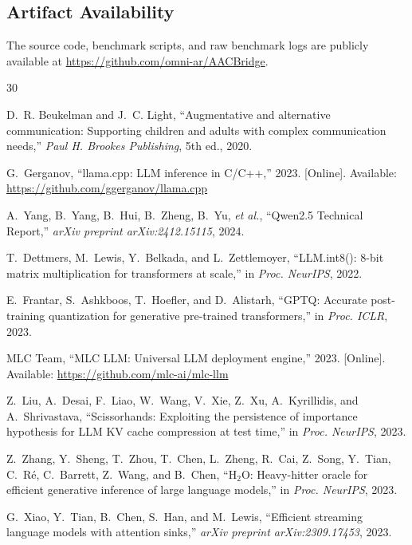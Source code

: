 \documentclass[journal]{IEEEtran}
\begin{document}
\subsection{Artifact Availability}

The source code, benchmark scripts, and raw benchmark logs are publicly available at \url{https://github.com/omni-ar/AACBridge}.

\begin{thebibliography}{30}

D.~R. Beukelman and J.~C. Light,
``Augmentative and alternative communication: Supporting children and adults with complex communication needs,''
\emph{Paul H. Brookes Publishing}, 5th ed., 2020.

G.~Gerganov,
``llama.cpp: LLM inference in {C/C++},''
2023. [Online]. Available: \url{https://github.com/ggerganov/llama.cpp}

A.~Yang, B.~Yang, B.~Hui, B.~Zheng, B.~Yu, \emph{et al.},
``{Qwen2.5 Technical Report},''
\emph{arXiv preprint arXiv:2412.15115}, 2024.

T.~Dettmers, M.~Lewis, Y.~Belkada, and L.~Zettlemoyer,
``{LLM.int8(): 8-bit matrix multiplication for transformers at scale},''
in \emph{Proc. NeurIPS}, 2022.

E.~Frantar, S.~Ashkboos, T.~Hoefler, and D.~Alistarh,
``{GPTQ: Accurate post-training quantization for generative pre-trained transformers},''
in \emph{Proc. ICLR}, 2023.

MLC Team,
``{MLC LLM}: Universal {LLM} deployment engine,''
2023. [Online]. Available: \url{https://github.com/mlc-ai/mlc-llm}

Z.~Liu, A.~Desai, F.~Liao, W.~Wang, V.~Xie, Z.~Xu, A.~Kyrillidis, and A.~Shrivastava,
``Scissorhands: Exploiting the persistence of importance hypothesis for {LLM} {KV} cache compression at test time,''
in \emph{Proc. NeurIPS}, 2023.

Z.~Zhang, Y.~Sheng, T.~Zhou, T.~Chen, L.~Zheng, R.~Cai, Z.~Song, Y.~Tian, C.~R\'{e}, C.~Barrett, Z.~Wang, and B.~Chen,
``{H$_2$O: Heavy-hitter oracle for efficient generative inference of large language models},''
in \emph{Proc. NeurIPS}, 2023.

G.~Xiao, Y.~Tian, B.~Chen, S.~Han, and M.~Lewis,
``{Efficient streaming language models with attention sinks},''
\emph{arXiv preprint arXiv:2309.17453}, 2023.


\end{thebibliography}
\end{document}
